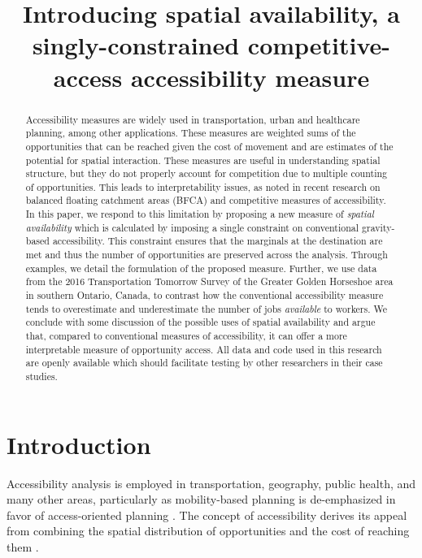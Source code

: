 \documentclass[]{elsarticle} %
\begin{document}
\begin{frontmatter}

  \title{Introducing spatial availability, a singly-constrained
competitive-access accessibility measure}
  
  \begin{abstract}
  Accessibility measures are widely used in transportation, urban and
  healthcare planning, among other applications. These measures are
  weighted sums of the opportunities that can be reached given the cost
  of movement and are estimates of the potential for spatial
  interaction. These measures are useful in understanding spatial
  structure, but they do not properly account for competition due to
  multiple counting of opportunities. This leads to interpretability
  issues, as noted in recent research on balanced floating catchment
  areas (BFCA) and competitive measures of accessibility. In this paper,
  we respond to this limitation by proposing a new measure of
  \emph{spatial availability} which is calculated by imposing a single
  constraint on conventional gravity-based accessibility. This
  constraint ensures that the marginals at the destination are met and
  thus the number of opportunities are preserved across the analysis.
  Through examples, we detail the formulation of the proposed measure.
  Further, we use data from the 2016 Transportation Tomorrow Survey of
  the Greater Golden Horseshoe area in southern Ontario, Canada, to
  contrast how the conventional accessibility measure tends to
  overestimate and underestimate the number of jobs \emph{available} to
  workers. We conclude with some discussion of the possible uses of
  spatial availability and argue that, compared to conventional measures
  of accessibility, it can offer a more interpretable measure of
  opportunity access. All data and code used in this research are openly
  available which should facilitate testing by other researchers in
  their case studies.
  \end{abstract}
  
 \end{frontmatter}

\newpage

\hypertarget{introduction}{%
\section{Introduction}\label{introduction}}

Accessibility analysis is employed in transportation, geography, public
health, and many other areas, particularly as mobility-based planning is
de-emphasized in favor of access-oriented planning
\citep{deboosere2018, handy2020, proffitt2017, yan2021}. The concept of
accessibility derives its appeal from combining the spatial distribution
of opportunities and the cost of reaching them
\citep{hansen1959, handy_measuring_1997}.
\end{document}
